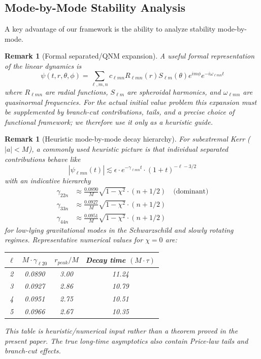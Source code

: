 \documentclass[12pt,a4paper]{article}
\newtheorem{remark}[theorem]{Remark}
\begin{document}
\subsection{Mode-by-Mode Stability Analysis}\label{subsec:mode-by-mode}

A key advantage of our framework is the ability to analyze stability mode-by-mode.

\begin{remark}[Formal separated/QNM expansion]\label{def:mode-decomposition}
A useful formal representation of the linear dynamics is
\begin{equation}
\psi(t, r, \theta, \phi) = \sum_{\ell, m, n} c_{\ell m n} R_{\ell m n}(r) S_{\ell m}(\theta) e^{i m \phi} e^{-i \omega_{\ell m n} t}
\end{equation}
where $R_{\ell m n}$ are radial functions, $S_{\ell m}$ are spheroidal harmonics, and $\omega_{\ell m n}$ are quasinormal frequencies. For the actual initial value problem this expansion must be supplemented by branch-cut contributions, tails, and a precise choice of functional framework; we therefore use it only as a heuristic guide.
\end{remark}

\begin{remark}[Heuristic mode-by-mode decay hierarchy]\label{thm:mode-hierarchy}
For subextremal Kerr ($|a| < M$), a commonly used heuristic picture is that individual separated contributions behave like
\begin{equation}
|\psi_{\ell m n}(t)| \lesssim \epsilon \cdot e^{-\gamma_{\ell m n} t} \cdot (1 + t)^{-\ell - 3/2}
\end{equation}
with an indicative hierarchy
\begin{align}
\gamma_{22n} &\approx \frac{0.0890}{M} \sqrt{1 - \chi^2} \cdot (n + 1/2) \quad \text{(dominant)} \\
\gamma_{33n} &\approx \frac{0.0927}{M} \sqrt{1 - \chi^2} \cdot (n + 1/2) \\
\gamma_{44n} &\approx \frac{0.0951}{M} \sqrt{1 - \chi^2} \cdot (n + 1/2)
\end{align}
for low-lying gravitational modes in the Schwarzschild and slowly rotating regimes. Representative numerical values for $\chi=0$ are:
\begin{center}
\begin{tabular}{@{}cccc@{}}
\toprule
$\ell$ & $M \cdot \gamma_{\ell20}$ & $r_{peak}/M$ & Decay time $(M \cdot \tau)$ \\
\midrule
2 & 0.0890 & 3.00 & 11.24 \\
3 & 0.0927 & 2.86 & 10.79 \\
4 & 0.0951 & 2.75 & 10.51 \\
5 & 0.0966 & 2.67 & 10.35 \\
\bottomrule
\end{tabular}
\end{center}
This table is heuristic/numerical input rather than a theorem proved in the present paper. The true long-time asymptotics also contain Price-law tails and branch-cut effects.
\end{remark}
\end{document}
